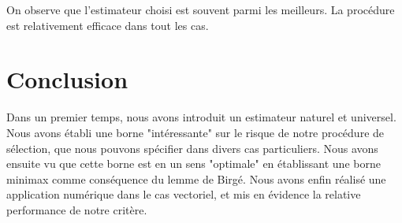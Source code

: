 \documentclass[11pt,letterpaper]{article}
\begin{document}
\par On observe que l'estimateur choisi est souvent parmi les meilleurs. La procédure est relativement efficace dans tout les cas.

\section{Conclusion}

\par Dans un premier temps, nous avons introduit un estimateur naturel et universel. Nous avons établi une borne "intéressante" sur le risque de notre procédure de sélection, que nous pouvons spécifier dans divers cas particuliers. Nous avons ensuite vu que cette borne est en un sens "optimale" en établissant une borne minimax comme conséquence du lemme de Birgé. Nous avons enfin réalisé une application numérique dans le cas vectoriel, et mis en évidence la relative performance de notre critère.





\pagebreak
\nocite{*}


\end{document}
